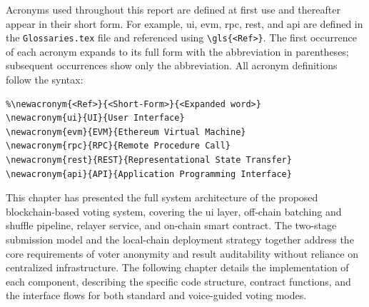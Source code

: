Acronyms used throughout this report are defined at first use and thereafter appear in their short form. For example, \gls{ui}, \gls{evm}, \gls{rpc}, \gls{rest}, and \gls{api} are defined in the \texttt{Glossaries.tex} file and referenced using \verb|\gls{<Ref>}|. The first occurrence of each acronym expands to its full form with the abbreviation in parentheses; subsequent occurrences show only the abbreviation. All acronym definitions follow the syntax:

\begin{verbatim}
%\newacronym{<Ref>}{<Short-Form>}{<Expanded word>}
\newacronym{ui}{UI}{User Interface}
\newacronym{evm}{EVM}{Ethereum Virtual Machine}
\newacronym{rpc}{RPC}{Remote Procedure Call}
\newacronym{rest}{REST}{Representational State Transfer}
\newacronym{api}{API}{Application Programming Interface}
\end{verbatim}

This chapter has presented the full system architecture of the proposed blockchain-based voting system, covering the \gls{ui} layer, off-chain batching and shuffle pipeline, relayer service, and on-chain smart contract. The two-stage submission model and the local-chain deployment strategy together address the core requirements of voter anonymity and result auditability without reliance on centralized infrastructure. The following chapter details the implementation of each component, describing the specific code structure, contract functions, and the interface flows for both standard and voice-guided voting modes.

